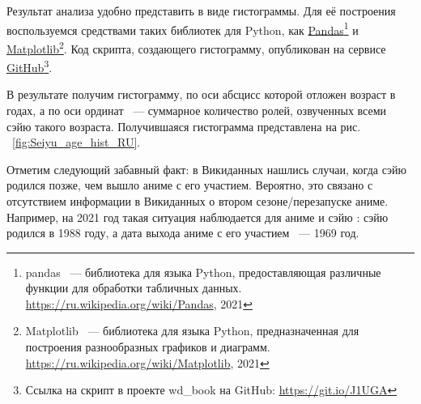 Результат анализа удобно представить в виде гистограммы. Для её построения воспользуемся средствами таких библиотек для Python, как \href{https://ru.wikipedia.org/wiki/Pandas}{Pandas}\footnote{pandas ~--- библиотека для языка Python, предоставляющая различные функции для обработки табличных данных. \href{https://ru.wikipedia.org/wiki/Pandas}{https://ru.wikipedia.org/wiki/Pandas}, 2021} и \href{https://ru.wikipedia.org/wiki/Matplotlib}{Matplotlib}\footnote{Matplotlib ~--- библиотека для языка Python, предназначенная для построения разнообразных графиков и диаграмм. \href{https://ru.wikipedia.org/wiki/Matplotlib}{https://ru.wikipedia.org/wiki/Matplotlib}, 2021}. Код скрипта, создающего гистограмму, опубликован на сервисе \href{https://git.io/J1UGA}{GitHub}\footnote{Ссылка на скрипт в проекте wd\_book на GitHub: \href{https://git.io/J1UGA}{https://git.io/J1UGA}}.

В результате получим гистограмму, по оси абсцисс которой отложен возраст в годах, а по оси ординат ~--- суммарное количество ролей, озвученных всеми сэйю такого возраста. Получившаяся гистограмма представлена на рис. ~\ref{fig:Seiyu_age_hist_RU}. 

\begin{figure*}[h]

    \setlength{\fboxsep}{0pt}%
    \setlength{\fboxrule}{1pt}%
	\caption[Гистограмма с числом аниме, озвученных сэйю разных возрастов, 2021.]{Гистограмма с числом аниме, озвученных различными сэйю, 2021. Гистограмма построена на основе данных, полученных с помощью запросов  ~\protect\ref{lst:seiyu_bd_w_service} (или ~\protect\ref{lst:seiyu_bd_w_rdfs}), ~\protect\ref{lst:all_anime_releases} и ~\protect\ref{lst:link_anime_seiyu}.}%
    \label{fig:Seiyu_age_hist_RU}%
\end{figure*} 
 	
Отметим следующий забавный факт: в Викиданных нашлись случаи, когда сэйю родился позже, чем вышло аниме с его участием. Вероятно, это связано с отсутствием информации в Викиданных о втором сезоне/перезапуске аниме. Например, на 2021 год такая ситуация наблюдается для аниме  и сэйю : сэйю родился в 1988 году, а дата выхода аниме с его участием ~--- 1969 год.

